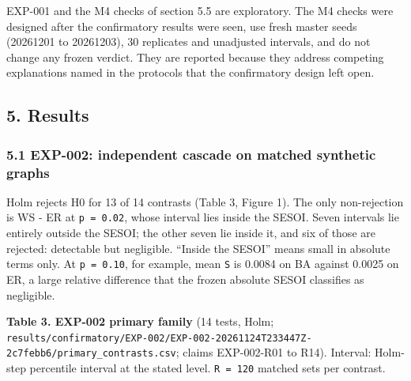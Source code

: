 \documentclass[
]{article}
\begin{document}
EXP-001 and the M4 checks of section 5.5 are exploratory. The M4 checks
were designed after the confirmatory results were seen, use fresh master
seeds (20261201 to 20261203), 30 replicates and unadjusted intervals,
and do not change any frozen verdict. They are reported because they
address competing explanations named in the protocols that the
confirmatory design left open.

\subsection{5. Results}\label{results}

\subsubsection{5.1 EXP-002: independent cascade on matched synthetic
graphs}\label{exp-002-independent-cascade-on-matched-synthetic-graphs}

Holm rejects H0 for 13 of 14 contrasts (Table 3, Figure 1). The only
non-rejection is WS - ER at \texttt{p\ =\ 0.02}, whose interval lies
inside the SESOI. Seven intervals lie entirely outside the SESOI; the
other seven lie inside it, and six of those are rejected: detectable but
negligible. ``Inside the SESOI'' means small in absolute terms only. At
\texttt{p\ =\ 0.10}, for example, mean \texttt{S} is 0.0084 on BA
against 0.0025 on ER, a large relative difference that the frozen
absolute SESOI classifies as negligible.

\textbf{Table 3. EXP-002 primary family} (14 tests, Holm;
\texttt{results/confirmatory/EXP-002/EXP-002-20261124T233447Z-2c7febb6/primary\_contrasts.csv};
claims EXP-002-R01 to R14). Interval: Holm-step percentile interval at
the stated level. \texttt{R\ =\ 120} matched sets per contrast.
\end{document}
